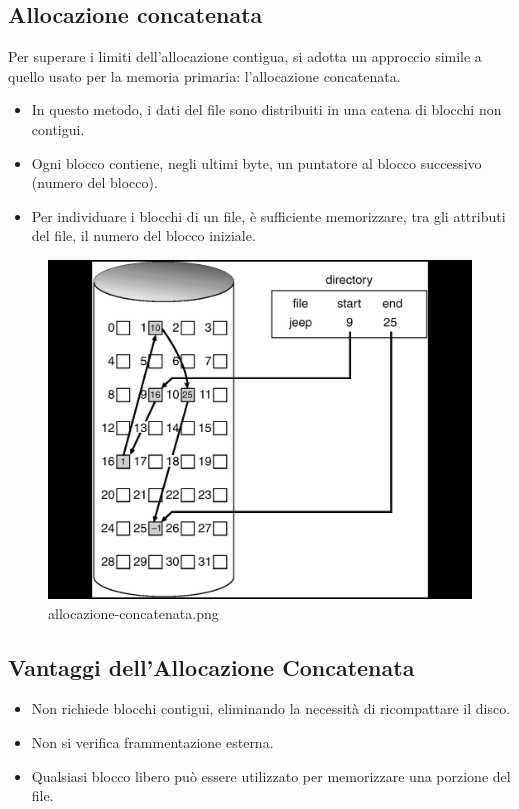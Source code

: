 \subsection{Allocazione concatenata}

Per superare i limiti dell'allocazione contigua, si adotta un approccio simile a quello usato per la memoria primaria: l'allocazione concatenata.

\begin{itemize}
    \item In questo metodo, i dati del file sono distribuiti in una catena di blocchi non contigui.
    \item Ogni blocco contiene, negli ultimi byte, un puntatore al blocco successivo (numero del blocco).
    \item Per individuare i blocchi di un file, è sufficiente memorizzare, tra gli attributi del file, il numero del blocco iniziale.
\end{itemize}


\begin{figure}[h] \centering \includegraphics[width=0.50\linewidth]{images/allocazione_concatenata.png} \caption{allocazione-concatenata.png} \end{figure}


\subsection{Vantaggi dell’Allocazione Concatenata}
\begin{itemize}
    \item Non richiede blocchi contigui, eliminando la necessità di ricompattare il disco.
    \item Non si verifica frammentazione esterna.
    \item Qualsiasi blocco libero può essere utilizzato per memorizzare una porzione del file.
\end{itemize}

